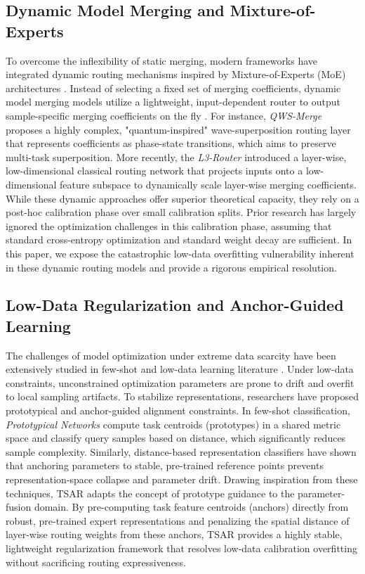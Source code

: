 \subsection{Dynamic Model Merging and Mixture-of-Experts}
To overcome the inflexibility of static merging, modern frameworks have integrated dynamic routing
mechanisms inspired by Mixture-of-Experts (MoE) architectures \cite{shazeer2017outrageously,
fedus2021switch}. Instead of selecting a fixed set of merging coefficients, dynamic model merging
models utilize a lightweight, input-dependent router to output sample-specific merging coefficients
on the fly \cite{shavit2023quantum, trial5_submission5}. For instance, \emph{QWS-Merge}
\cite{shavit2023quantum} proposes a highly complex, "quantum-inspired" wave-superposition routing
layer that represents coefficients as phase-state transitions, which aims to preserve multi-task
superposition. More recently, the \emph{L3-Router} \cite{trial5_submission5} introduced a
layer-wise, low-dimensional classical routing network that projects inputs onto a low-dimensional
feature subspace to dynamically scale layer-wise merging coefficients. While these dynamic
approaches offer superior theoretical capacity, they rely on a post-hoc calibration phase over small
calibration splits. Prior research has largely ignored the optimization challenges in this
calibration phase, assuming that standard cross-entropy optimization and standard weight decay are
sufficient. In this paper, we expose the catastrophic low-data overfitting vulnerability inherent in
these dynamic routing models and provide a rigorous empirical resolution.

\subsection{Low-Data Regularization and Anchor-Guided Learning}
The challenges of model optimization under extreme data scarcity have been extensively studied in
few-shot and low-data learning literature \cite{snell2017prototypical, loshchilov2017adamw}. Under
low-data constraints, unconstrained optimization parameters are prone to drift and overfit to local
sampling artifacts. To stabilize representations, researchers have proposed prototypical and
anchor-guided alignment constraints. In few-shot classification, \emph{Prototypical Networks}
\cite{snell2017prototypical} compute task centroids (prototypes) in a shared metric space and
classify query samples based on distance, which significantly reduces sample complexity. Similarly,
distance-based representation classifiers \cite{mensink2013distance, bengio2013representation} have
shown that anchoring parameters to stable, pre-trained reference points prevents
representation-space collapse and parameter drift. Drawing inspiration from these techniques, TSAR
adapts the concept of prototype guidance to the parameter-fusion domain. By pre-computing task
feature centroids (anchors) directly from robust, pre-trained expert representations and penalizing
the spatial distance of layer-wise routing weights from these anchors, TSAR provides a highly
stable, lightweight regularization framework that resolves low-data calibration overfitting without
sacrificing routing expressiveness.